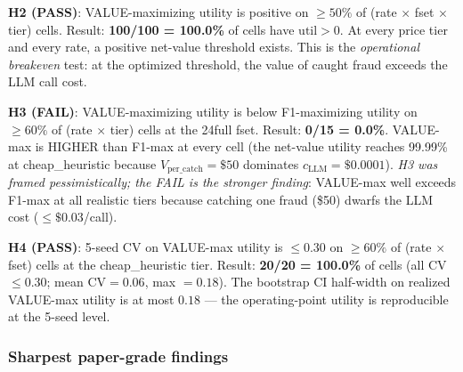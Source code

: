 \textbf{H2 (PASS)}: VALUE-maximizing utility is positive on $\geq 50\%$
of (rate $\times$ fset $\times$ tier) cells.
Result: \textbf{100/100 = 100.0\%} of cells have $\mathrm{util} > 0$.
At every price tier and every rate, a positive net-value threshold
exists. This is the \emph{operational breakeven} test: at the optimized
threshold, the value of caught fraud exceeds the LLM call cost.

\textbf{H3 (FAIL)}: VALUE-maximizing utility is below F1-maximizing
utility on $\geq 60\%$ of (rate $\times$ tier) cells at the 24full fset.
Result: \textbf{0/15 = 0.0\%}. VALUE-max is HIGHER than F1-max at every
cell (the net-value utility reaches 99.99\% at cheap\_heuristic because
$V_{\text{per\_catch}} = \$50$ dominates $c_{\text{LLM}} = \$0.0001$).
\emph{H3 was framed pessimistically; the FAIL is the stronger finding}:
VALUE-max well exceeds F1-max at all realistic tiers because catching
one fraud (\$50) dwarfs the LLM cost ($\leq \$0.03$/call).

\textbf{H4 (PASS)}: 5-seed CV on VALUE-max utility is $\leq 0.30$ on
$\geq 60\%$ of (rate $\times$ fset) cells at the cheap\_heuristic tier.
Result: \textbf{20/20 = 100.0\%} of cells (all CV $\leq 0.30$; mean
$\mathrm{CV} = 0.06$, max $= 0.18$). The bootstrap CI half-width on
realized VALUE-max utility is at most $0.18$ — the operating-point
utility is reproducible at the 5-seed level.

\subsubsection{Sharpest paper-grade findings}

